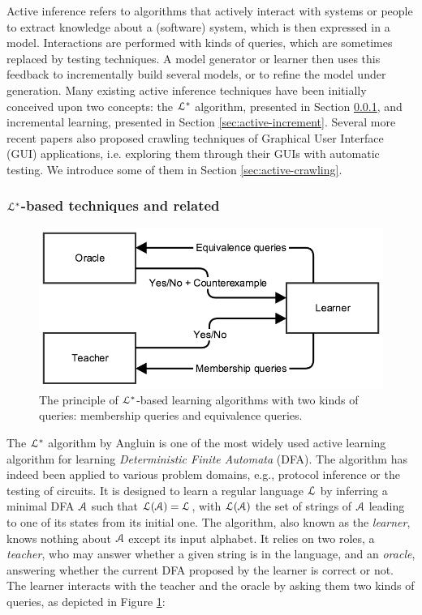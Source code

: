 Active inference refers to algorithms that actively interact with
systems or people to extract knowledge about a (software) system,
which is then expressed in a model. Interactions are performed
with kinds of queries, which are sometimes replaced by testing
techniques. A model generator or learner then uses this feedback
to incrementally build several models, or to refine the model
under generation. Many existing active inference techniques have
been initially conceived upon two concepts: the $\EuScript{L}^*$
algorithm, presented in Section \ref{sec:active-letoile}, and
incremental learning, presented in Section
\ref{sec:active-increment}. Several more recent papers also
proposed crawling techniques of Graphical User Interface (GUI)
applications, i.e. exploring them through their GUIs with
automatic testing. We introduce some of them in Section
\ref{sec:active-crawling}.

\subsubsection{$\EuScript{L}^*$-based techniques and related}
\label{sec:active-letoile}

\begin{figure}[h]
    \begin{center}
        \includegraphics[width=0.9\linewidth]{figures/angluin.png}
    \end{center}

    \caption{The principle of $\EuScript{L}^*$-based learning
    algorithms with two kinds of queries: membership queries and
    equivalence queries.}
    \label{fig:angluin}
\end{figure}

The $\EuScript{L}^*$ algorithm by Angluin \cite{Angluin198787} is
one of the most widely used active learning algorithm for
learning \textit{Deterministic Finite Automata} (DFA). The
algorithm has indeed been applied to various problem domains,
e.g., protocol inference or the testing of circuits. It is
designed to learn a regular language $\EuScript{L}$ by inferring
a minimal DFA $\EuScript{A}$ such that
$\EuScript{L}(\EuScript{A})=\EuScript{L}$, with
$\EuScript{L}(\EuScript{A})$ the set of strings of $\EuScript{A}$
leading to one of its states from its initial one. The algorithm,
also known as the \textit{learner}, knows nothing about
$\EuScript{A}$ except its input alphabet. It relies on two roles,
a \textit{teacher}, who may answer whether a given string is in
the language, and an \textit{oracle}, answering whether the
current DFA proposed by the learner is correct or not. The
learner interacts with the teacher and the oracle by asking them
two kinds of queries, as depicted in Figure \ref{fig:angluin}:

